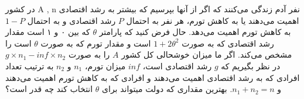 \problem{}
در کشور A , n
نفر آدم زندگی می‌کنند که اگر از آنها بپرسیم که بیشتر به رشد اقتصادی اهمیت می‌دهند یا به کاهش تورم، هر نفر به احتمال $P$ رشد اقتصادی و به احتمال $1-P$ به کاهش تورم اهمیت می‌دهد. حال فرض کنید که پارامتر $\theta$ که بین ۰ و ۱ است مقدار رشد اقتصادی که به صورت
 $1 + 2\theta^2$ 
است و مقدار تورم که به صورت
 $\theta$
 است را مشخص می‌کند. اگر ما میزان خوشحالی کل کشور $A$ را به صورت 
 $g \times n_{1} - inf \times n_{2}$ 
 در نظر بگیریم که $g$ رشد اقتصادی است، $inf$ میزان تورم،
  $n_{1}$
   و
    $n_{2}$
    به ترتیب تعداد افرادی که به رشد اقتصادی اهمیت می‌دهند و افرادی که به کاهش تورم اهمیت می‌دهند و
    $n_{1} + n_{2} = n$.
    بهترین مقداری که دولت میتواند برای 
    $\theta$
    انتخاب کند چه قدر است؟
